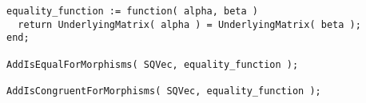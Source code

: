 \begin{small}
\begin{Verbatim}[frame=single]
equality_function := function( alpha, beta )
  return UnderlyingMatrix( alpha ) = UnderlyingMatrix( beta );
end;

AddIsEqualForMorphisms( SQVec, equality_function );

AddIsCongruentForMorphisms( SQVec, equality_function );
\end{Verbatim}
\end{small}